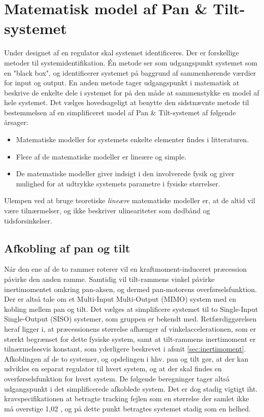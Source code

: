 \section{Matematisk model af Pan \& Tilt-systemet}
\label{sec:matPTS}
Under designet af en regulator skal systemet identificeres. Der er forskellige metoder til systemidentifikation.
Én metode ser som udgangspunkt systemet som en "black box", og identificerer systemet
på baggrund af sammenhørende værdier for input og output.
En anden metode tager udgangspunkt i matematisk at beskrive de enkelte dele i systemet
for på den måde at sammenstykke en model af hele systemet.
Det vælges hovedsageligt at benytte den sidstnævnte metode til bestemmelsen af en simplificeret
model af Pan \& Tilt-systemet af følgende årsager:
\begin{itemize}
\itemsep1pt
\item Matematiske modeller for systemets enkelte elementer findes i litteraturen.
\item Flere af de matematiske modeller er lineære og simple.
\item De matematiske modeller giver indsigt i den involverede fysik og giver mulighed
	for at udtrykke systemets parametre i fysiske størrelser.
\end{itemize}
Ulempen ved at bruge teoretiske \textit{lineære} matematiske modeller er,
at de altid vil være tilnærmelser, og ikke beskriver ulineariteter som dødbånd og tidsforsinkelser.

%
\subsection{Afkobling af pan og tilt}
Når den ene af de to rammer roterer vil en kraftmoment-induceret præcession påvirke den anden ramme.
Samtidig vil tilt-rammens vinkel påvirke inertimomentet omkring pan-aksen, og dermed
pan-motorens overførselsfunktion.
Der er altså tale om et Multi-Input Multi-Output (MIMO) system med en kobling mellem pan og tilt.
Det vælges at simplificere systemet til to Single-Input Single-Output (SISO) systemer, som gruppen er bekendt med.
Retfærdiggørelsen heraf ligger i, at præcessionens størrelse afhænger af vinkelaccelerationen, som er stærkt begrænset
for dette fysiske system, samt at tilt-rammens inertimoment er tilnærmelsesvis konstant, som yderligere beskrevet i afsnit \ref{sec:inertimoment}.
Afkoblingen af de to systemer, og opdelingen i hhv. pan og tilt gør, at der kan udvikles en separat regulator
til hvert system, og at der skal findes en overførselsfunktion for hvert system.
De følgende beregninger tager altså udgangspunkt i det simplificerede afkoblede system.
Det er dog stadig vigtigt iht. kravspecifikationen at betragte tracking fejlen som en størrelse der samlet
ikke må overstige 1,02 \degree, og på dette punkt betragtes systemet stadig som en helhed.

